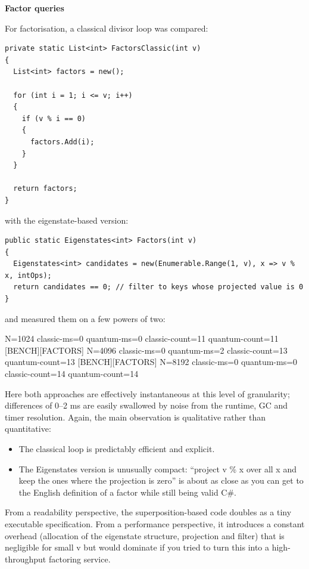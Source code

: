 \documentclass[a4paper,11pt]{article}
\begin{document}
\textbf{Factor queries}

For factorisation, a classical divisor loop was compared:

\begin{lstlisting}[style=codeblock]
private static List<int> FactorsClassic(int v)
{
  List<int> factors = new();

  for (int i = 1; i <= v; i++)
  {
    if (v % i == 0)
    {
      factors.Add(i);
    }
  }

  return factors;
}
\end{lstlisting}

with the eigenstate-based version:

\begin{lstlisting}[style=codeblock]
public static Eigenstates<int> Factors(int v)
{
  Eigenstates<int> candidates = new(Enumerable.Range(1, v), x => v % x, intOps);
  return candidates == 0; // filter to keys whose projected value is 0
}
\end{lstlisting}

and measured them on a few powers of two:

\begin{datadump}
[BENCH][FACTORS] N=1024 classic-ms=0 quantum-ms=0 classic-count=11 quantum-count=11
[BENCH][FACTORS] N=4096 classic-ms=0 quantum-ms=2 classic-count=13 quantum-count=13
[BENCH][FACTORS] N=8192 classic-ms=0 quantum-ms=0 classic-count=14 quantum-count=14
\end{datadump}

Here both approaches are effectively instantaneous at this level of granularity; differences of 0--2 ms are easily swallowed by noise from the runtime, GC and timer resolution. Again, the main observation is qualitative rather than quantitative:

\begin{itemize}
\item
  The classical loop is predictably efficient and explicit.
\item
  The Eigenstates version is unusually compact: ``project v \% x over all x and keep the ones where the projection is zero'' is about as close as you can get to the English definition of a factor while still being valid C\#.
\end{itemize}

From a readability perspective, the superposition-based code doubles as a tiny executable specification. From a performance perspective, it introduces a constant overhead (allocation of the eigenstate structure, projection and filter) that is negligible for small v but would dominate if you tried to turn this into a high-throughput factoring service.
\end{document}
